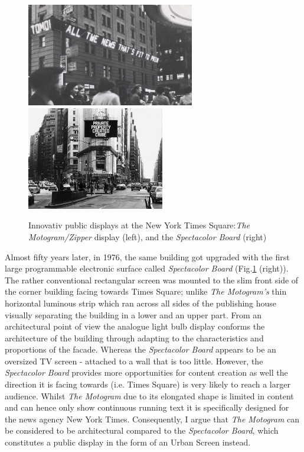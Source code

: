 \begin{figure} [h!]
    \centering
        \includegraphics[height=4.5cm]{Illustrations/zipper.jpg}
        \includegraphics[height=4.5cm]{Illustrations/Spectacolor_JennyHolzer_.jpg}
    \caption[First public displays]{Innovativ public displays at the New York Times Square:\textit{The Motogram/Zipper} display (left), and the \textit{Spectacolor Board} (right)}
    \label{DigitalSignage}
\end{figure}

Almost fifty years later, in 1976, the same building got upgraded with the first large programmable electronic surface called \textit{Spectacolor Board} (Fig.\ref{DigitalSignage} (right)).
The rather conventional rectangular screen was mounted to the slim front side of the corner building facing towards Times Square; unlike \textit{The Motogram's} thin horizontal luminous strip which ran across all sides of the publishing house visually separating the building in a lower and an upper part. 
From an architectural point of view the analogue light bulb display conforms the architecture of the building through adapting to the characteristics and proportions of the facade. Whereas the \textit{Spectacolor Board} appears to be an oversized TV screen - attached to a wall that is too little. However, the \textit{Spectacolor Board} provides more opportunities for content creation as well the direction it is facing towards (i.e. Times Square) is very likely to reach a larger audience. Whilst \textit{The Motogram} due to its elongated shape is limited in content and can hence only show continuous running text it is specifically designed for the news agency New York Times.
Consequently, I argue that \textit{The Motogram} can be considered to be architectural compared to the \textit{Spectacolor Board}, which constitutes a public display in the form of an Urban Screen instead.



